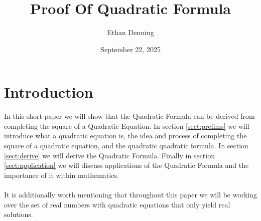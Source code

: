 \documentclass{article}
\title{Proof Of Quadratic Formula}
\author{Ethan Denning}
\date{September 22, 2025}
\theoremstyle{plain}
\theoremstyle{definition}
\begin{document}
\maketitle

\section{Introduction}
In this short paper we will show that the Quadratic Formula can be derived from completing the square of a Quadratic Equation. In section \ref{sect:prelims} we will introduce what a quadratic equation is, the idea and process of completing the square of a quadratic equation, and the quadratic quadratic formula. In section \ref{sect:derive} we will derive the Quadratic Formula. Finally in section \ref{sect:application} we will discuss applications of the Quadratic Formula and the importance of it within mathematics.\\\\
It is additionally worth mentioning that throughout this paper we will be working over the set of real numbers with quadratic equations that only yield real solutions. 
\end{document}
